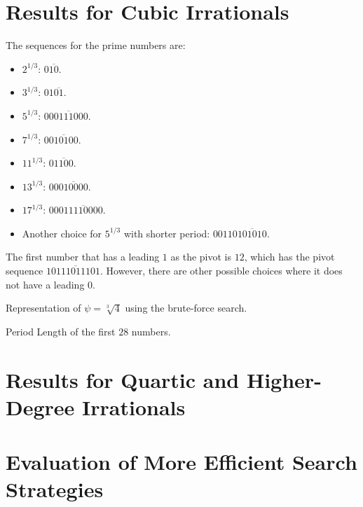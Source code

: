 \section{Results for Cubic Irrationals}

\begin{example}
  The sequences for the prime numbers are:
  \begin{itemize}
    \item $2^{1/3}$: $0\overline{10}$.
    \item $3^{1/3}$: $01\overline{01}$.
    \item $5^{1/3}$: $0\overline{00111000}$.
    \item $7^{1/3}$: $0\overline{010100}$.
    \item $11^{1/3}$: $0\overline{1100}$.
    \item $13^{1/3}$: $00\overline{010000}$.
    \item $17^{1/3}$: $000\overline{11110000}$.
    \item Another choice for $5^{1/3}$ with shorter period: $00110\overline{101010}$.
  \end{itemize}
\end{example}

\begin{remark}
  The first number that has a leading $1$ as the pivot is $12$,
  which has the pivot sequence $1\overline{0111011101}$.
  However, there are other possible choices where it does not have a leading $0$.
\end{remark}

\begin{table}[t]
  \caption{Representation of $ψ = \sqrt[3]{4}$ using the brute-force search.}
  \label{table:cube-root-4}
  \centering
  
\end{table}

\begin{table}[t]
  \caption{Period Length of the first $28$ numbers.}
  \centering
  
\end{table}

\section{Results for Quartic and Higher-Degree Irrationals}

\section{Evaluation of More Efficient Search Strategies}

